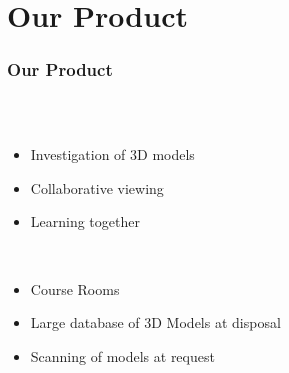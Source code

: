 \section{Our Product}

\begin{frame}
  \frametitle{Our Product}
   \begin{columns}
    \begin{column}{0.8\textwidth}
      \begin{description}[]
        \item[What is it?] \hfill \\
        \begin{itemize}
          \item  Investigation of  3D models
          \item Collaborative viewing
          \item Learning together
        \end{itemize}

        \bigskip
        \item[Key features ] \hfill \\
          \begin{itemize}
            \item Course Rooms
            \item Large database of 3D Models at disposal
            \item Scanning of models at request
        \end{itemize}
      \end{description}
    \end{column}


\end{columns}
\end{frame}
